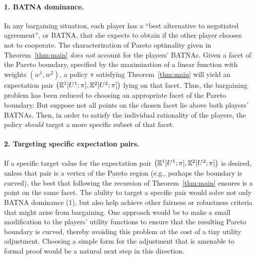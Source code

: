 \documentclass{article}
\newcommand{\epair}{\left(\EE^1[U^1;\pi],\EE^2[U^2;\pi]\right)}
\newcommand{\thm}[1]{Theorem~\ref{thm:#1}}
\begin{document}
\paragraph{1. BATNA dominance.}  In any bargaining situation, each player has a ``best alternative to negotiated agreement'', or BATNA, that she expects to obtain if the other player chooses not to cooperate.  The characterization of Pareto optimality given in \thm{main} {\em does not} account for the players' BATNAs.  Given a facet of the Pareto boundary, specified by the maximization of a linear function with weights $(w^1,w^2)$, a policy $\pi$ satisfying \thm{main} will yield an expectation pair $\epair$ lying on that facet.  Thus, the bargaining problem has been reduced to choosing an appropriate facet of the Pareto boundary.  But suppose not all points on the chosen facet lie above both players' BATNAs.  Then, in order to satisfy the individual rationality of the players, the policy {\em should} target a more specific subset of that facet.

\paragraph{2. Targeting specific expectation pairs.}  If a specific target value for the expectation pair $\epair$ is desired, unless that pair is a vertex of the Pareto region (e.g., perhaps the boundary is curved), the best that following the recursion of \thm{main} ensures is a point on the same facet.  The ability to target a specific pair would solve not only BATNA dominance (1), but also help achieve other fairness or robustness criteria that might arise from bargaining.  One approach would be to make a small modification to the players' utility functions to ensure that the resulting Pareto boundary is curved, thereby avoiding this problem at the cost of a tiny utility adjustment.  Choosing a simple form for the adjustment that is amenable to formal proof would be a natural next step in this direction.
\end{document}
